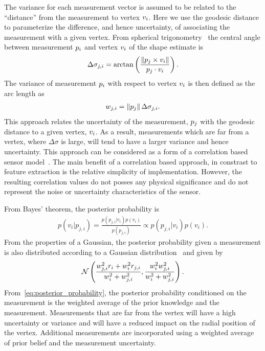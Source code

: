 The variance for each measurement vector is assumed to be related to the ``distance'' from the measurement to vertex \( v_i \).
Here we use the \gls{geodesic} distance to parameterize the difference, and hence  uncertainty, of associating the measurement with a given vertex.
From spherical trigonometry~\cite{gade2010} the central angle between measurement \( p_i \) and vertex \( v_i \) of the shape estimate is
\begin{align}\label{eq:geodesic_distance}
    \Delta \sigma_{j,i} = \arctan \left( \frac{\left\| p_j \times v_i \right\|}{p_j \cdot v_i } \right).
\end{align}
The variance of measurement \( p_i \) with respect to vertex \( v_i \) is then defined as the arc length as
\begin{align}
    w_{j, i} = \left\| p_j \right\| \Delta \sigma_{j,i} .
\end{align}
This approach relates the uncertainty of the measurement, \( p_j \) with the geodesic distance to a given vertex, \( v_i \).
As a result, measurements which are far from a vertex, where \( \Delta \sigma \) is large, will tend to have a larger variance and hence uncertainty. 
This approach can be considered as a form of a correlation based sensor model~\cite{thrun2005}.
The main benefit of a correlation based approach, in constrast to feature extraction is the relative simplicity of implementation.
However, the resulting correlation values do not posses any physical significance and do not represent the noise or uncertainty characteristics of the sensor.

From Bayes' theorem, the posterior probability is
\begin{align}
    p(v_i | p_{j, i}) = \frac{p(p_{j, i} | v_i) p(v_i)}{p( p_{j, i})} \propto p(p_{j,i} | v_i) p(v_i).
\end{align}
From the properties of a Gaussian, the posterior probability given a measurement is also distributed according to a Gaussian distribution~\cite{bishop2006} and given by
\begin{align}\label{eq:posterior_probability}
    \mathcal{N} \left( \frac{w_{j, i}^2 r_i + w_i^2 r_{j, i}}{w_i^2 + w_{j, i}^2} , \frac{w_i^2  w_{j, i}^2}{w_i^2 +  w_{j, i}^2} \right) .
\end{align}
From~\cref{eq:posterior_probability}, the posterior probability conditioned on the measurement is the weighted average of the prior knowledge and the measurement. 
Measurements that are far from the vertex will have a high uncertainty or variance and will have a reduced impact on the radial position of the vertex.
Additional measurements are incorporated using a weighted average of prior belief and the measurement uncertainty.

